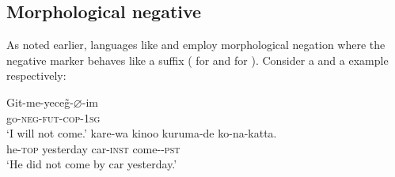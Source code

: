 \documentclass[output=paper
 	        ,biblatex
                ,babelshorthands
                ,newtxmath
                ,draftmode
                ,colorlinks, citecolor=brown
]{langscibook}
\begin{document}
\begin{exe}
\begin{xlist}
\begin{exe}
\begin{xlist}
%




%

\section{Morphological negative}

As noted earlier, languages like  and  employ morphological negation
where the negative marker behaves like a suffix (\citealt[]{kelepir} for  and
\citealt{Kato:97,Kato:00} for ). Consider a  and a  example
respectively:

\eal
\ex
\label{negation-turkish-jap}
\gll Git-me-yece\~{g}-$\varnothing$-im \\
     go-\textsc{neg-fut-cop}-\textsc{1sg} \\
\glt `I will not come.'
\ex
\gll kare-wa kinoo kuruma-de ko-na-katta. \\
     he-\textsc{top} yesterday car-\textsc{inst} come-\NEG-\textsc{pst} \\
\glt `He did not come by car yesterday.'
\zl


\end{xlist}
\end{exe}
\end{xlist}
\end{exe}
\end{document}
